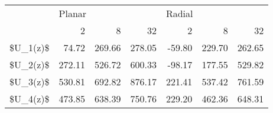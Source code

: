 \begin{tabular}{lrrrrrr}
\toprule
{} & \multicolumn{3}{l}{Planar} & \multicolumn{3}{l}{Radial} \\
{} &     2  &     8  &     32 &     2  &     8  &     32 \\
\midrule
\$U\_1(z)\$ &  74.72 & 269.66 & 278.05 & -59.80 & 229.70 & 262.65 \\
\$U\_2(z)\$ & 272.11 & 526.72 & 600.33 & -98.17 & 177.55 & 529.82 \\
\$U\_3(z)\$ & 530.81 & 692.82 & 876.17 & 221.41 & 537.42 & 761.59 \\
\$U\_4(z)\$ & 473.85 & 638.39 & 750.76 & 229.20 & 462.36 & 648.31 \\
\bottomrule
\end{tabular}
